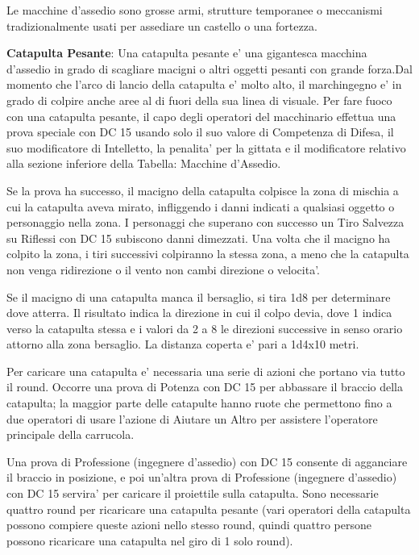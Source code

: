 \documentclass[a4paper,11pt,twoside,openany]{dndbook}
\begin{document}
{Le macchine d'assedio sono grosse armi, strutture temporanee o meccanismi tradizionalmente usati per assediare un castello o una fortezza.

\textbf{Catapulta Pesante}: Una catapulta pesante e' una gigantesca macchina d'assedio in grado di scagliare macigni o altri oggetti pesanti con grande forza.Dal momento che l'arco di lancio della catapulta e' molto alto, il marchingegno e' in grado di colpire anche aree al di fuori della sua linea di visuale. Per fare fuoco con una catapulta pesante, il capo degli operatori del macchinario effettua una prova speciale con DC 15 usando solo il suo valore di Competenza di Difesa, il suo modificatore di Intelletto, la penalita' per la gittata e il modificatore relativo alla sezione inferiore della Tabella: Macchine d'Assedio. 

Se la prova ha successo, il macigno della catapulta colpisce la zona di mischia a cui la catapulta aveva mirato, infliggendo i danni indicati a qualsiasi oggetto o personaggio nella zona. I personaggi che superano con successo un Tiro Salvezza su Riflessi con DC 15 subiscono danni dimezzati. Una volta che il macigno ha colpito la zona, i tiri successivi colpiranno la stessa zona, a meno che la catapulta non venga ridirezione o il vento non cambi direzione o velocita'.

Se il macigno di una catapulta manca il bersaglio, si tira 1d8 per determinare dove atterra. Il risultato indica la direzione in cui il colpo devia, dove 1 indica verso la catapulta stessa e i valori da 2 a 8 le direzioni successive in senso orario attorno alla zona bersaglio. La distanza coperta e' pari a 1d4x10 metri.

Per caricare una catapulta e' necessaria una serie di azioni che portano via tutto il round. Occorre una prova di Potenza con DC 15 per abbassare il braccio della catapulta; la maggior parte delle catapulte hanno ruote che permettono fino a due operatori di usare l'azione di Aiutare un Altro per assistere l'operatore principale della carrucola.

Una prova di Professione (ingegnere d'assedio) con DC 15 consente di agganciare il braccio in posizione, e poi un'altra prova di Professione (ingegnere d'assedio) con DC 15 servira' per caricare il proiettile sulla catapulta. Sono necessarie quattro round per ricaricare una catapulta pesante (vari operatori della catapulta possono compiere queste azioni nello stesso round, quindi quattro persone possono ricaricare una catapulta nel giro di 1 solo round).

}
\end{document}
